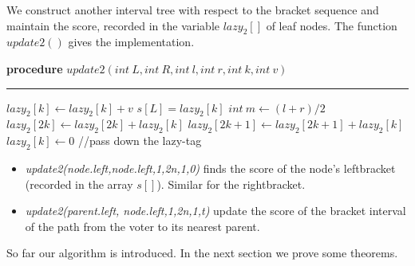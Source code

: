 We construct another interval tree with respect to the bracket sequence  and maintain the score, recorded in the variable $lazy_2[]$ of leaf nodes. The function $update2()$ gives the implementation.
\begin{algorithm}
	\textbf{procedure} $update2(int~L,int ~R, int~l, int~r, int~k, int~v)$
	\hrule
	{
       $lazy_2[k] \leftarrow lazy_2[k]+v$\;
       {
       	   $s[L]=lazy_2[k]$
       }
	}
	{
		$int~m \leftarrow (l+r)/2$\;
		$lazy_2[2k] \leftarrow lazy_2[2k]+lazy_2[k]$\;
		$lazy_2[2k+1]\leftarrow lazy_2[2k+1]+lazy_2[k]$\;
		$lazy_2[k] \leftarrow 0$
			{\color{gray}
		//pass down the lazy-tag}\;
    }
\end{algorithm}
\begin{itemize}
	\item {\em update2(node.left,node.left,1,2n,1,0)} finds the score of the node's leftbracket (recorded in the array $s[]$). Similar for the rightbracket. 
	\item {\em update2(parent.left, node.left,1,2n,1,t)} update the score of the bracket interval of the path from the voter to its nearest parent.
\end{itemize}
So far our algorithm is introduced. In the next section we prove some theorems.